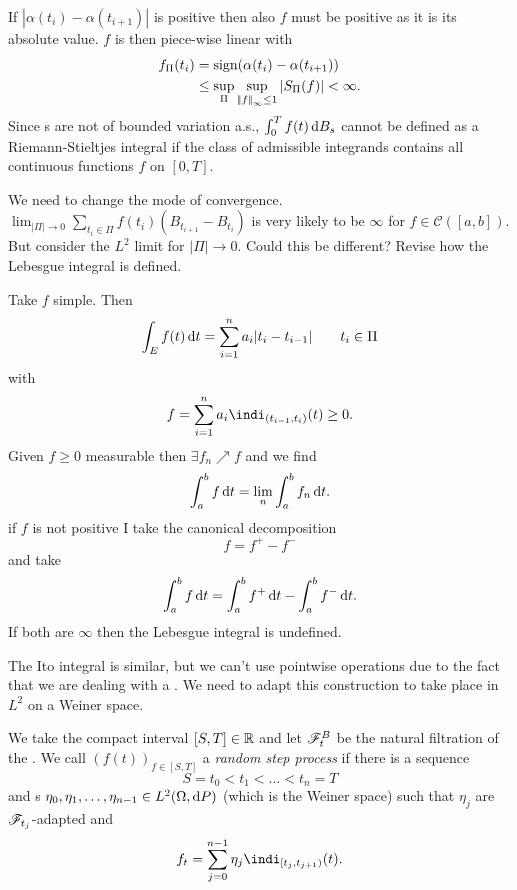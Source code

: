 \documentclass[crop=false, class=article]{standalone}
\begin{document}
\begin{fancyproof}
\begin{figure}[H]
		\label{fig:screenshot001}
	\end{figure}
	If $|\alpha(t_{i})-\alpha(t_{i+1})|$ is positive then also $f$ must be positive as it is its absolute value. $f$ is then piece-wise linear with 
	\begin{align*}
		f_{\Pi}(t_{i}) & =\mathrm{sign}(\alpha(t_{i})-\alpha(t_{i+1}))\\
		 & \leq\sup_{\Pi}\sup_{\left|\negthinspace\left|f\right|\negthinspace\right|_{\infty}\leq1}|S_{\Pi}(f)|<\infty.
	\end{align*}
	Since \brm s are not of bounded variation a.s., $\int_{0}^{T}f(t)\mathop{}\!\mathrm{d} B_{s}$ cannot be defined as a Riemann-Stieltjes integral if the class of admissible integrands contains all continuous functions $f$ on $[0,T]$.
\end{fancyproof}
We need to change the mode of convergence. $\lim_{|\Pi|\to 0}\sum_{t_i\in\Pi}f(t_{i})(B_{t_{i+1}}-B_{t_{i}})$ is very likely to be $\infty$ for $f\in\mathcal{C}([a,b])$. But consider the $L^{2}$ limit for $|\Pi|\to0$. Could this be different? Revise how the Lebesgue integral is defined.
\begin{revise}
	Take $f$ simple. Then
	\begin{equation*}
		\int_{E}f(t)\mathop{}\!\mathrm{d} t=\sum_{i=1}^{n}a_{i}|t_{i}-t_{i-1}| \qquad t_{i}\in\Pi
	\end{equation*}
	with
	\begin{equation*}
		f=\sum_{i=1}^{n}a_{i}\indi_{(t_{i-1},t_{i})}(t)\geq0.
	\end{equation*}
	Given $f\geq0$ measurable then $\exists f_{n}\nearrow f$ and we find
	\begin{equation*}
		\int_{a}^{b}f\mathop{}\!\mathrm{d} t=\lim_{n}\int_{a}^{b}f_{n}\mathop{}\!\mathrm{d} t.
	\end{equation*}
	if $f$ is not positive I take the canonical decomposition
	\begin{equation*}
		f=f^{+}-f^{-}
	\end{equation*}
	and take
	\begin{equation*}
			\int_{a}^{b}f\mathop{}\!\mathrm{d} t=	\int_{a}^{b}f^{+}\mathop{}\!\mathrm{d} t-	\int_{a}^{b}f^{-}\mathop{}\!\mathrm{d} t.
	\end{equation*}
	If both are $\infty$ then the Lebesgue integral is undefined.
\end{revise}
The Ito integral is similar, but we can't use pointwise operations due to the fact that we are dealing with a \brm{}. We need to adapt this construction to take place in $L^{2}$ on a Weiner space.
\begin{definition}
	We take the compact interval $[S,T]\in\mathbb{R}$ and let $\mathscr{F}^{B}_{t}$ be the natural filtration of the \brm. We call ${(f(t))}_{f\in[S,T]}$ a \emph{random step process} if there is a sequence
	\begin{equation*}
		S=t_{0}<t_1<\ldots<t_n=T
	\end{equation*}
	and \rv s $\eta_0,\eta_1,\ldots,\eta_{n-1}\in L^{2}(\Omega,\mathop{}\!\mathrm{d} P)$ (which is the Weiner space) such that $\eta_j$ are $\mathscr{F}_{t_j}$-adapted and
	\begin{equation*}
		f_{t}=\sum_{j=0}^{n-1}\eta_j\indi_{[t_j,t_{j+1})}(t).
	\end{equation*}
\end{definition}
\end{document}
